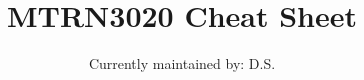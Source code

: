 \documentclass[10pt,twocolumn]{article}
\begin{document}
\title{\Huge \bf MTRN3020 Cheat Sheet}
\author{\large Currently maintained by: D.S.}

\maketitle









\printbibliography
\end{document}
